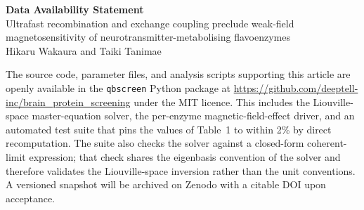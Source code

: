 \documentclass[11pt]{article}
\begin{document}
\begin{center}
{\large\textbf{Data Availability Statement}}\\[0.3em]
{\normalsize Ultrafast recombination and exchange coupling preclude weak-field
magnetosensitivity of neurotransmitter-metabolising flavoenzymes}\\[0.2em]
{\small Hikaru Wakaura and Taiki Tanimae}
\end{center}

\vspace{1em}

\noindent
The source code, parameter files, and analysis scripts supporting this article
are openly available in the \texttt{qbscreen} Python package at
\url{https://github.com/deeptell-inc/brain_protein_screening} under the MIT
licence. This includes the Liouville-space master-equation solver, the per-enzyme
magnetic-field-effect driver, and an automated test suite that pins the values of
Table~1 to within 2\% by direct recomputation. The suite also checks the solver
against a closed-form coherent-limit expression; that check shares the eigenbasis
convention of the solver and therefore validates the Liouville-space inversion
rather than the unit conventions. A versioned snapshot will be archived on Zenodo with a
citable DOI upon acceptance.
\end{document}
